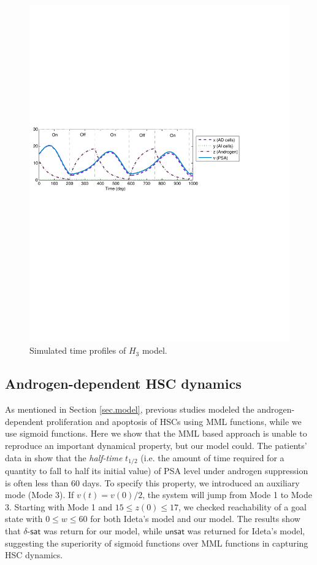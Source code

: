 \begin{figure}[htb]
\centering
\includegraphics[scale=0.5]{fig-prostatetraj}
\caption{Simulated time profiles of $H_3$ model.}
\label{prostate-fig1}
\end{figure}

\subsection{Androgen-dependent HSC dynamics}

As mentioned in Section \ref{sec.model}, previous studies \cite{jackson04a,jackson04b,ideta08} modeled the androgen-dependent proliferation and apoptosis of HSCs using MML functions, while we use sigmoid functions. Here we show that the MML based approach is unable to reproduce an important dynamical property, but our model could. The patients' data in \cite{ bruchovsky06,bruchovsky07} show that the \textit{half-time} $t_{1/2}$ (i.e. the amount of time required for a quantity to fall to half its initial value) of PSA level under androgen suppression is often less than $60$ days. To specify this property, we introduced an auxiliary mode (Mode 3). If $v(t)=v(0)/2$, the system will jump from Mode 1 to Mode 3. Starting with Mode 1 and $15 \le z(0) \le 17$, we checked reachability of a goal state with $0 \le w \le 60$ for both Ideta's model \cite{ideta08} and our model. The results show that  $\delta$-$\mathsf{sat}$ was return for our model, while $\mathsf{unsat}$ was returned for Ideta's model, suggesting the superiority of sigmoid functions over MML functions in capturing HSC dynamics.


